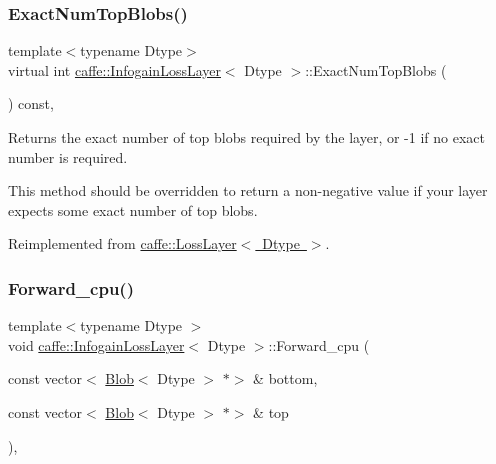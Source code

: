 \subsubsection{\texorpdfstring{Exact\+Num\+Top\+Blobs()}{ExactNumTopBlobs()}\hspace{0.1cm}{\footnotesize\ttfamily [2/2]}}
{\footnotesize\ttfamily template$<$typename Dtype$>$ \\
virtual int \mbox{\hyperlink{classcaffe_1_1_infogain_loss_layer}{caffe\+::\+Infogain\+Loss\+Layer}}$<$ Dtype $>$\+::Exact\+Num\+Top\+Blobs (\begin{DoxyParamCaption}{ }\end{DoxyParamCaption}) const\hspace{0.3cm}{\ttfamily [inline]}, {\ttfamily [virtual]}}



Returns the exact number of top blobs required by the layer, or -\/1 if no exact number is required. 

This method should be overridden to return a non-\/negative value if your layer expects some exact number of top blobs. 

Reimplemented from \mbox{\hyperlink{classcaffe_1_1_loss_layer_aa5d5ab714a14082f5343dc9c49025b23}{caffe\+::\+Loss\+Layer$<$ Dtype $>$}}.

\mbox{\label{classcaffe_1_1_infogain_loss_layer_a134b51c126eb4b62fac804965f8d8327}} 
\subsubsection{\texorpdfstring{Forward\+\_\+cpu()}{Forward\_cpu()}\hspace{0.1cm}{\footnotesize\ttfamily [1/2]}}
{\footnotesize\ttfamily template$<$typename Dtype $>$ \\
void \mbox{\hyperlink{classcaffe_1_1_infogain_loss_layer}{caffe\+::\+Infogain\+Loss\+Layer}}$<$ Dtype $>$\+::Forward\+\_\+cpu (\begin{DoxyParamCaption}\item[{const vector$<$ \mbox{\hyperlink{classcaffe_1_1_blob}{Blob}}$<$ Dtype $>$ $\ast$$>$ \&}]{bottom,  }\item[{const vector$<$ \mbox{\hyperlink{classcaffe_1_1_blob}{Blob}}$<$ Dtype $>$ $\ast$$>$ \&}]{top }\end{DoxyParamCaption})\hspace{0.3cm}{\ttfamily [protected]}, {\ttfamily [virtual]}}




